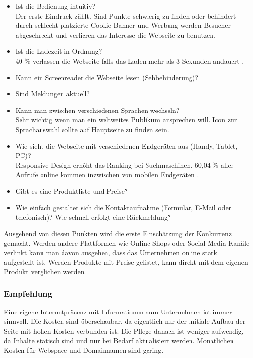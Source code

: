 \begin{itemize}
\item Ist die Bedienung intuitiv?\\
Der erste Eindruck zählt. Sind Punkte schwierig zu finden oder behindert durch schlecht platzierte Cookie Banner und Werbung werden Besucher abgeschreckt und verlieren das Interesse die Webseite zu benutzen.
\item Ist die Ladezeit in Ordnung?\\
40 \% verlassen die Webseite falls das Laden mehr als 3 Sekunden andauert \cite{ladezeit}.
\item Kann ein Screenreader die Webseite lesen (Sehbehinderung)?
\item Sind Meldungen aktuell?
\item Kann man zwischen verschiedenen Sprachen wechseln?\\
Sehr wichtig wenn man ein weltweites Publikum ansprechen will. Icon zur Sprachauswahl sollte auf Hauptseite zu finden sein.
\item Wie sieht die Webseite mit verschiedenen Endgeräten aus (Handy, Tablet, PC)?\\
Responsive Design erhöht das Ranking bei Suchmaschinen. 60,04 \% aller Aufrufe online kommen inzwischen von mobilen Endgeräten \cite{mobileDevices}.
\item Gibt es eine Produktliste und Preise?
\item Wie einfach gestaltet sich die Kontaktaufnahme (Formular, E-Mail oder telefonisch)? Wie schnell erfolgt eine Rückmeldung?
\end{itemize}

Ausgehend von diesen Punkten wird die erste Einschätzung der Konkurrenz gemacht. Werden andere Plattformen wie Online-Shops oder Social-Media Kanäle verlinkt kann man davon ausgehen, dass das Unternehmen online stark aufgestellt ist. Werden Produkte mit Preise gelistet, kann direkt mit dem eigenen Produkt verglichen werden.

\subsubsection*{Empfehlung}

Eine eigene Internetpräsenz mit Informationen zum Unternehmen ist immer sinnvoll. Die Kosten sind überschaubar, da eigentlich nur der initiale Aufbau der Seite mit hohen Kosten verbunden ist. Die Pflege danach ist weniger aufwendig, da Inhalte statisch sind und nur bei Bedarf aktualisiert werden. Monatlichen Kosten für Webspace und Domainnamen sind gering.

